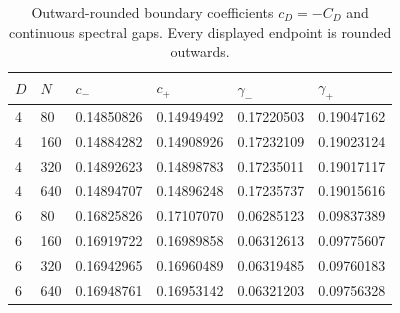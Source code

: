 \begin{table}[htbp]
\centering
\caption{Outward-rounded boundary coefficients $c_D=-C_D$ and continuous spectral gaps. Every displayed endpoint is rounded outwards.}
\label{tab:boundary_certificates}
\begin{tabular}{llllll}
\toprule
$D$ & $N$ & $c_-$ & $c_+$ & $\gamma_-$ & $\gamma_+$ \\
\midrule
4 & 80 & 0.14850826 & 0.14949492 & 0.17220503 & 0.19047162 \\
4 & 160 & 0.14884282 & 0.14908926 & 0.17232109 & 0.19023124 \\
4 & 320 & 0.14892623 & 0.14898783 & 0.17235011 & 0.19017117 \\
4 & 640 & 0.14894707 & 0.14896248 & 0.17235737 & 0.19015616 \\
6 & 80 & 0.16825826 & 0.17107070 & 0.06285123 & 0.09837389 \\
6 & 160 & 0.16919722 & 0.16989858 & 0.06312613 & 0.09775607 \\
6 & 320 & 0.16942965 & 0.16960489 & 0.06319485 & 0.09760183 \\
6 & 640 & 0.16948761 & 0.16953142 & 0.06321203 & 0.09756328 \\
\bottomrule
\end{tabular}
\end{table}
